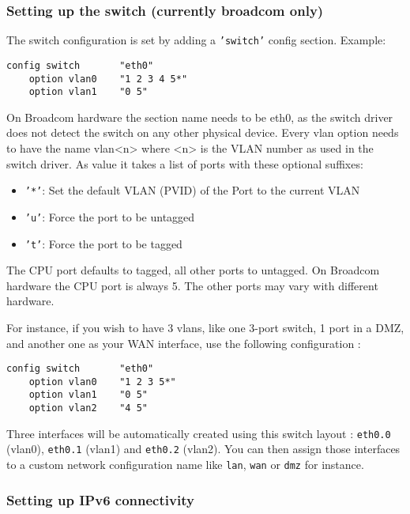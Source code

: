 \subsubsection{Setting up the switch (currently broadcom only)}

The switch configuration is set by adding a \texttt{'switch'} config section.
Example:

\begin{Verbatim}
config switch       "eth0"
    option vlan0    "1 2 3 4 5*"
    option vlan1    "0 5"
\end{Verbatim}

On Broadcom hardware the section name needs to be eth0, as the switch driver
does not detect the switch on any other physical device.
Every vlan option needs to have the name vlan<n> where <n> is the VLAN number
as used in the switch driver.
As value it takes a list of ports with these optional suffixes:

\begin{itemize}
    \item{\texttt{'*'}:}
        Set the default VLAN (PVID) of the Port to the current VLAN
    \item{\texttt{'u'}:}
        Force the port to be untagged
    \item{\texttt{'t'}:}
        Force the port to be tagged
\end{itemize}

The CPU port defaults to tagged, all other ports to untagged.
On Broadcom hardware the CPU port is always 5. The other ports may vary with
different hardware.

For instance, if you wish to have 3 vlans, like one 3-port switch, 1 port in a
DMZ, and another one as your WAN interface, use the following configuration :

\begin{Verbatim}
config switch       "eth0"
    option vlan0    "1 2 3 5*"
    option vlan1    "0 5"
    option vlan2    "4 5"
\end{Verbatim}

Three interfaces will be automatically created using this switch layout :
\texttt{eth0.0} (vlan0), \texttt{eth0.1} (vlan1) and \texttt{eth0.2} (vlan2).
You can then assign those interfaces to a custom network configuration name
like \texttt{lan}, \texttt{wan} or \texttt{dmz} for instance.

\subsubsection{Setting up IPv6 connectivity}

